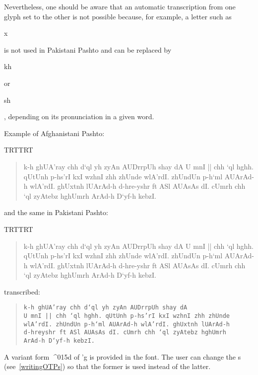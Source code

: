 \documentclass[a4paper,11pt]{article}
\def\shortpashto#1{{\pushocplist\AfghaPashtoOCP\fontfamily{omarb}\selectfont#1\popocplist}}
\begin{document}
Nevertheless, one should be aware that an automatic transcription from
one glyph set to the other is not possible because, for example, a
letter such as \begin{pashto}x\end{pashto} is not used in Pakistani
Pashto and can be replaced by \begin{pashto}kh\end{pashto} or
\begin{pashto}sh\end{pashto}, depending on its pronunciation in a given word.

\noindent
Example of Afghanistani Pashto: 

{\pardir TRT\textdir TRT
\begin{quote}
\pushocplist\AfghaPashtoOCP{}\selectfont k-h ghUA'ray
chh d`ql yh zyAn AUDrrpUh shay dA U mnI || chh `ql hghh.  qUtUnh
p-hs'rI kxI wzhnI zhh zhUnde wlA'rdI. zhUndUn p-h`ml AUArAd-h
wlA'rdI. ghUxtnh lUArAd-h d-hre-yshr ft ASl AUAsAs dI. cUmrh chh `ql
zyAtebz hghUmrh ArAd-h D`yf-h kebzI.  \popocplist
\end{quote}}

\noindent
and the same in Pakistani Pashto: 

{\pardir TRT\textdir TRT
\begin{quote}
\pushocplist\PakiPashtoOCP{}\selectfont k-h ghUA'ray
chh d`ql yh zyAn AUDrrpUh shay dA U mnI || chh `ql hghh.  qUtUnh
p-hs'rI kxI wzhnI zhh zhUnde wlA'rdI. zhUndUn p-h`ml AUArAd-h
wlA'rdI. ghUxtnh lUArAd-h d-hre-yshr ft ASl AUAsAs dI. cUmrh chh `ql
zyAtebz hghUmrh ArAd-h D`yf-h kebzI.  \popocplist
\end{quote}}

\noindent
transcribed:

\begin{quote}
\texttt{k-h ghUA'ray chh d`ql yh zyAn AUDrrpUh shay dA\\
U mnI || chh `ql hghh. qUtUnh p-hs'rI kxI wzhnI zhh zhUnde\\
wlA'rdI. zhUndUn p-h`ml AUArAd-h wlA'rdI. ghUxtnh lUArAd-h\\
d-hreyshr ft ASl AUAsAs dI. cUmrh chh `ql zyAtebz hghUmrh\\
ArAd-h D`yf-h kebzI.}
\end{quote}

A variant form \shortpashto{^^^^015d} of \shortpashto{'g} is provided
in the font. The user can change the \OTP{}s (see~\ref{writingOTPs})
so that the former is used instead of the latter.
\end{document}
